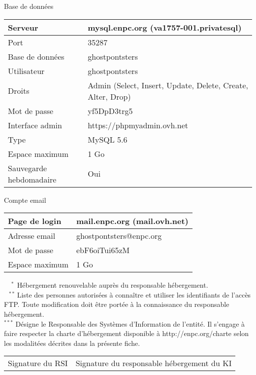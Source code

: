 \documentclass{ki019}
\newenvironment{tableau}[1]{
\LARGE #1\\
\vspace{0.4cm}
\begin{tabular}{|K{5cm}|K{10cm}|}
}
{
\end{tabular}
\vspace{0.5cm}
}
\begin{document}
\begin{center}
\begin{tableau}{Base de données}
\hline
Serveur & mysql.enpc.org (va1757-001.privatesql) \\
\hline
Port & 35287 \\
\hline
Base de données & ghostpontsters \\
\hline
Utilisateur & ghostpontsters \\
\hline
Droits & Admin (Select, Insert, Update, Delete, Create, Alter, Drop) \\
\hline
Mot de passe & yf5DpD3trg5 \\
\hline
Interface admin & https://phpmyadmin.ovh.net \\
\hline
Type & MySQL 5.6 \\
\hline
Espace maximum & 1 Go \\
\hline
Sauvegarde hebdomadaire & Oui \\
\hline
\end{tableau}

\begin{tableau}{Compte email}
\hline
Page de login & mail.enpc.org (mail.ovh.net) \\
\hline
Adresse email & ghostpontsters@enpc.org \\
\hline
Mot de passe & ebF6oiTui65zM \\
\hline
Espace maximum & 1 Go \\
\hline
\end{tableau}

\end{center}

\vspace{-0.5cm}
\noindent
$^{\phantom{**}*}$ Hébergement renouvelable auprès du responsable hébergement. \\
$^{\phantom{*}**}$ Liste des personnes autorisées à connaître et utiliser les identifiants de l'accès FTP. Toute modification doit être portée à la connaissance du responsable hébergement. \\
$^{***}$ Désigne le Responsable des Systèmes d'Information de l'entité. Il s'engage à faire respecter la charte d'hébergement disponible à http://enpc.org/charte selon les modalitées décrites dans la présente fiche.

\vspace{0.5cm}
\Large
\begin{tabular}{p{6cm}p{9.5cm}}
Signature du RSI & Signature du responsable hébergement du KI
\end{tabular}

\Footer{\today}
\end{document}
